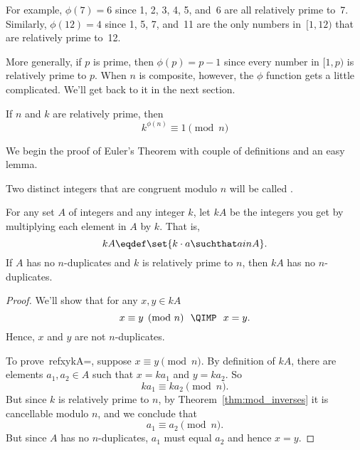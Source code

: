 For example, $\phi(7) = 6$ since 1, 2, 3, 4, 5, and~6
are all relatively prime to~7.  Similarly, $\phi(12) = 4$ since 1, 5,
7, and~11 are the only numbers in~$[1, 12)$ that are relatively prime
  to~12.

More generally, if $p$ is prime, then $\phi(p) = p - 1$ since every
number in $[1,p)$ is relatively prime to $p$.  When $n$ is composite,
  however, the $\phi$ function gets a little complicated.  We'll get
  back to it in the next section.

\begin{theorem}
If $n$ and $k$ are relatively prime, then
\begin{equation*}
    k^{\phi(n)} \equiv 1 \pmod{n}
\end{equation*}
\end{theorem}

We begin the proof of Euler's Theorem with couple of definitions and
an easy lemma.

\begin{definition}
Two distinct integers that are congruent modulo $n$
will be called .
\end{definition}

\begin{lemma}\label{lem:crdkA=crdA}
For any set $A$ of integers and any integer $k$, let $kA$ be the
integers you get by multiplying each element in $A$ by $k$.
That is,
\[
kA \eqdef \set{k \cdot a \suchthat a in A}.
\]
If $A$ has no $n$-duplicates and $k$ is relatively prime to $n$, then
$kA$ has no $n$-duplicates.

\begin{proof}
We'll show that for any $x,y \in kA$
\begin{equation}\label{xykA=}
x \equiv y \pmod{n}\ \ \QIMP\ \ x = y.
\end{equation}
Hence, $x$ and $y$ are not $n$-duplicates.

To prove~ref{xykA=}, suppose $x \equiv y \pmod{n}$.  By definition of
$kA$, there are elements $a_1,a_2 \in A$ such that $x = ka_1$ and
$y=ka_2$.  So
\[
ka_1 \equiv ka_2 \pmod n.
\]
But since $k$ is relatively prime to $n$, by
Theorem~\ref{thm:mod_inverses} it is cancellable modulo $n$, and we
conclude that
\[
a_1 \equiv a_2 \pmod n.
\]
But since $A$ has no $n$-duplicates, $a_1$ must equal $a_2$ and hence
$x =y$.
\end{proof}

\end{lemma}


